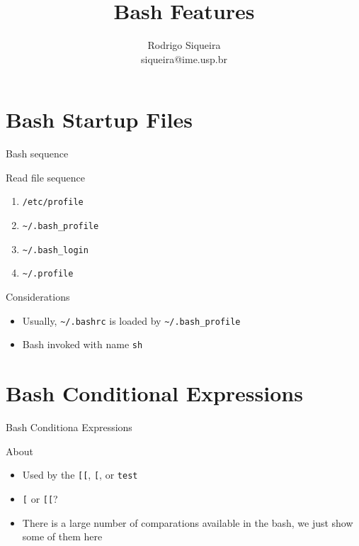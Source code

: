 \documentclass[10pt, compress, aspectratio=169]{beamer}
\title{Bash Features}
\author{\footnotesize Rodrigo Siqueira \\ {\scriptsize siqueira@ime.usp.br}}
\begin{document}
\maketitle

\section{Bash Startup Files}
\begin{frame}{Bash sequence}
  \begin{exampleblock}{Read file sequence}
		\begin{enumerate}
			\item \texttt{/etc/profile}
			\item \texttt{\~{}/.bash\_profile}
			\item \texttt{\~{}/.bash\_login}
			\item \texttt{\~{}/.profile}
		\end{enumerate}
	\end{exampleblock}

	\begin{exampleblock}{Considerations}
		\begin{itemize}
			\item Usually, \texttt{\~{}/.bashrc} is loaded by
						\texttt{\~{}/.bash\_profile}
			\item Bash invoked with name \texttt{sh}
		\end{itemize}
	\end{exampleblock}
\end{frame}

\section{Bash Conditional Expressions}
\begin{frame}{Bash Conditiona Expressions}
  \begin{exampleblock}{About}
    \begin{itemize}
      \item Used by the \texttt{[[}, \texttt{[}, or \texttt{test}
			\item \texttt{[} or \texttt{[[}?
			\item There is a large number of comparations available in the bash, we
						just show some of them here
    \end{itemize}
  \end{exampleblock}
\end{frame}
\end{document}
